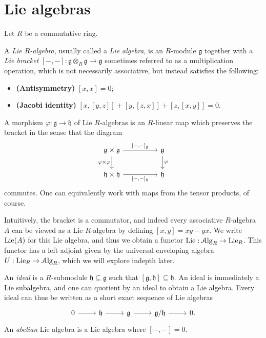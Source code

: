 \section{Lie algebras}

Let $R$ be a commutative ring.

\begin{definition}\label{7.1.1}
	A \emph{Lie $R$-algebra}, usually called a \emph{Lie algebra}, is an $R$-module $\mathfrak{g} $ together with a \emph{Lie bracket} $[-,-]: \mathfrak{g} \otimes_R\mathfrak{g}  \to \mathfrak{g} $ sometimes referred to as a multiplication operation, which is not necessarily associative, but instead satisfies the following:
	\begin{itemize}
		\item \textbf{(Antisymmetry)} $[x,x]=0$;
		\item \textbf{(Jacobi identity)} $[x,[y,z]]+[y,[z,x]]+[z,[x,y]]=0$. 
	\end{itemize}
	A morphism $\varphi : \mathfrak{g}  \to \mathfrak{h} $ of Lie $R$-algebras is an $R$-linear map which preserves the bracket in the sense that the diagram
\[\begin{tikzcd}
	{\mathfrak{g}\times \mathfrak{g}} && {\mathfrak{g}} \\
	{\mathfrak{h}\times \mathfrak{h}} && {\mathfrak{h}}
	\arrow["{[-,-]_\mathfrak{g}}", from=1-1, to=1-3]
	\arrow["{\varphi\times \varphi}"', from=1-1, to=2-1]
	\arrow["\varphi", from=1-3, to=2-3]
	\arrow["{[-,-]_\mathfrak{h}}"', from=2-1, to=2-3]
\end{tikzcd}\]
	commutes. One can equivalently work with maps from the tensor products, of course.
\end{definition}

Intuitively, the bracket is a commutator, and indeed every associative $R$-algebra $A$ can be viewed as a Lie $R$-algebra by defining $[x,y]=xy-yx$. We write $\mathrm{Lie}(A)$ for this Lie algebra, and thus we obtain a functor $\mathrm{Lie} : \mathcal{A}\mathrm{lg}_R \to \mathrm{Lie}_R $. This functor has a left adjoint given by the universal enveloping algebra $U : \mathrm{Lie}_R \to \mathcal{A}\mathrm{lg}_R$, which we will explore indepth later.

An \emph{ideal} is a $R$-submodule $\mathfrak{h} \subseteq \mathfrak{g} $ such that $[\mathfrak{g} ,\mathfrak{h} ]\subseteq \mathfrak{h} $. An ideal is immediately a Lie subalgebra, and one can quotient by an ideal to obtain a Lie algebra. Every ideal can thus be written as a short exact sequence of Lie algebras
\[\begin{tikzcd}[row sep = 2.5em, column sep = 2.5em]
0\ar[r]  & \mathfrak{h} \ar[r]  & \mathfrak{g} \ar[r]  & \mathfrak{g} /\mathfrak{h} \ar[r]  & 0.
\end{tikzcd}\]
An \emph{abelian} Lie algebra is a Lie algebra where $[-,-]=0$.

